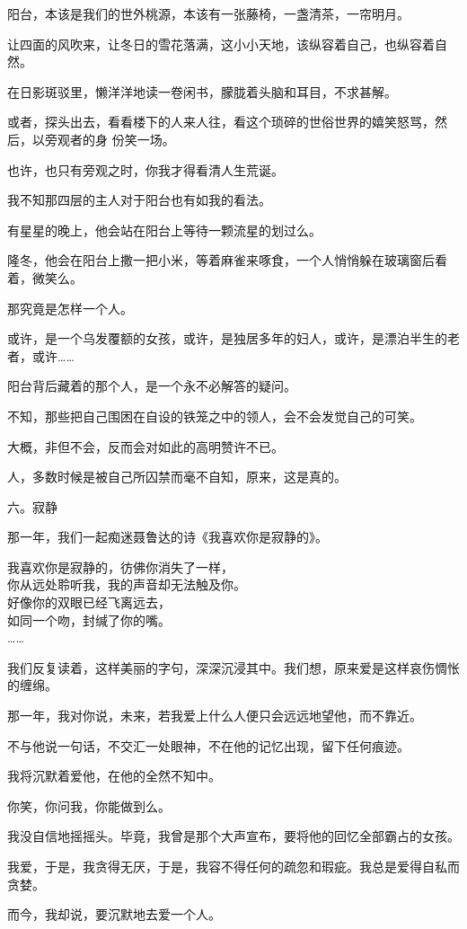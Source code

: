 \documentclass[12pt,a4paper]{article}
\newcommand{\subpart}[1]{
	\begingroup \par
	\vspace{1ex} \centering #1
	\par \endgroup \nopagebreak[4]
}
\begin{document}
		阳台，本该是我们的世外桃源，本该有一张藤椅，一盏清茶，一帘明月。\par
		让四面的风吹来，让冬日的雪花落满，这小小天地，该纵容着自己，也纵容着自然。\par
		在日影斑驳里，懒洋洋地读一卷闲书，朦胧着头脑和耳目，不求甚解。

		或者，探头出去，看看楼下的人来人往，看这个琐碎的世俗世界的嬉笑怒骂，然后，以旁观者的身
	份笑一场。

		也许，也只有旁观之时，你我才得看清人生荒诞。\par
		我不知那四层的主人对于阳台也有如我的看法。\par
		有星星的晚上，他会站在阳台上等待一颗流星的划过么。\par
		隆冬，他会在阳台上撒一把小米，等着麻雀来啄食，一个人悄悄躲在玻璃窗后看着，微笑么。\par
		那究竟是怎样一个人。\par
		或许，是一个乌发覆额的女孩，或许，是独居多年的妇人，或许，是漂泊半生的老者，或许……\par
		阳台背后藏着的那个人，是一个永不必解答的疑问。\par
		不知，那些把自己围困在自设的铁笼之中的领人，会不会发觉自己的可笑。\par
		大概，非但不会，反而会对如此的高明赞许不已。\par
		人，多数时候是被自己所囚禁而毫不自知，原来，这是真的。


		\subpart{六。寂静}

		那一年，我们一起痴迷聂鲁达的诗《我喜欢你是寂静的》。

		\longpoem{}{}{}
		我喜欢你是寂静的，彷佛你消失了一样，\\
		你从远处聆听我，我的声音却无法触及你。\\
		好像你的双眼已经飞离远去，\\
		如同一个吻，封缄了你的嘴。\\
		……
		\endlongpoem

		我们反复读着，这样美丽的字句，深深沉浸其中。我们想，原来爱是这样哀伤惆怅的缠绵。\par
		那一年，我对你说，未来，若我爱上什么人便只会远远地望他，而不靠近。\par
		不与他说一句话，不交汇一处眼神，不在他的记忆出现，留下任何痕迹。\par
		我将沉默着爱他，在他的全然不知中。\par
		你笑，你问我，你能做到么。\par
		我没自信地摇摇头。毕竟，我曾是那个大声宣布，要将他的回忆全部霸占的女孩。\par
		我爱，于是，我贪得无厌，于是，我容不得任何的疏忽和瑕疵。我总是爱得自私而贪婪。\par
		而今，我却说，要沉默地去爱一个人。
\end{document}
